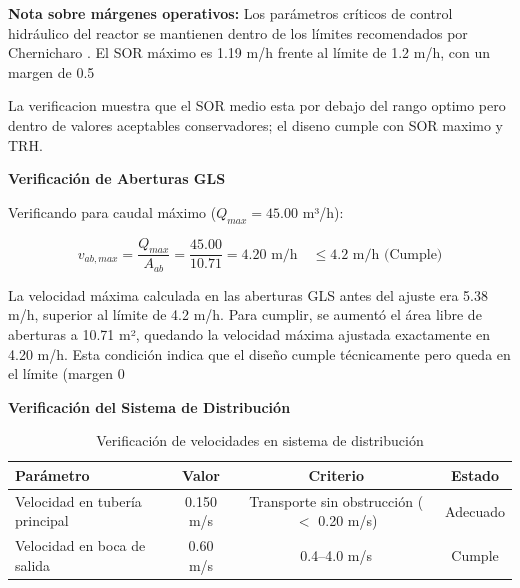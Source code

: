 \textbf{Nota sobre márgenes operativos:} Los parámetros críticos de control hidráulico del reactor se mantienen dentro de los límites recomendados por Chernicharo \cite{chernicharo2007}. El SOR máximo es 1.19 m/h frente al límite de 1.2 m/h, con un margen de 0.5%

La verificacion muestra que el SOR medio esta por debajo del rango optimo pero dentro de valores aceptables conservadores; el diseno cumple con SOR maximo y TRH.

\textbf{Verificación de Aberturas GLS}

Verificando para caudal máximo ($Q_{max} = 45.00$ m³/h):

\begin{equation}
v_{ab,max} = \frac{Q_{max}}{A_{ab}} = \frac{45.00}{10.71} = 4.20 \text{ m/h} \quad \leq 4.2 \text{ m/h } \text{(Cumple)}
\end{equation}

La velocidad máxima calculada en las aberturas GLS antes del ajuste era 5.38 m/h, superior al límite de 4.2 m/h. Para cumplir, se aumentó el área libre de aberturas a 10.71 m², quedando la velocidad máxima ajustada exactamente en 4.20 m/h. Esta condición indica que el diseño cumple técnicamente pero queda en el límite (margen 0 %

\textbf{Verificación del Sistema de Distribución}

\begin{table}[H]
\centering
\caption{Verificación de velocidades en sistema de distribución}
\begin{tabular}{lccc}
\toprule
\textbf{Parámetro} & \textbf{Valor} & \textbf{Criterio} & \textbf{Estado} \\
\midrule
Velocidad en tubería principal& 0.150 m/s & Transporte sin obstrucción ($<$ 0.20 m/s) & Adecuado \\
Velocidad en boca de salida & 0.60 m/s & 0.4--4.0 m/s & Cumple \\
\bottomrule
\end{tabular}
\end{table}

